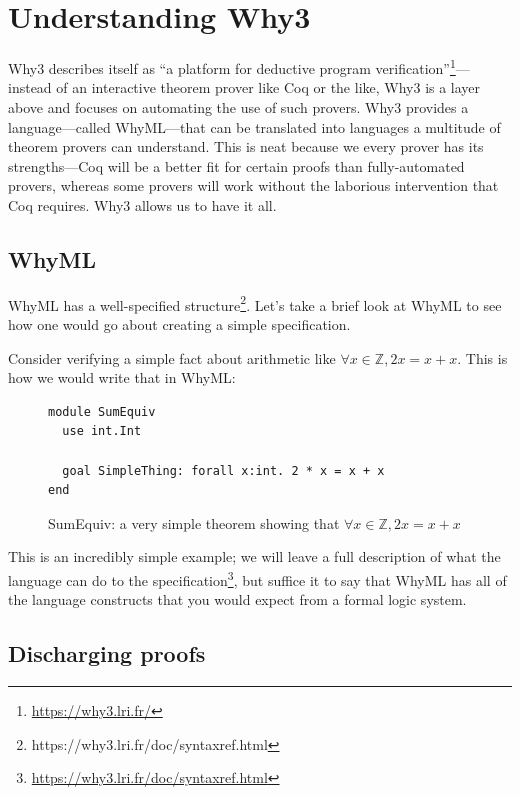 \documentclass[12pt]{article}
\begin{document}

\section{Understanding Why3}
\label{why-why3}

Why3 describes itself as ``a platform for deductive program verification''\footnote{\url{https://why3.lri.fr/}}---instead of an interactive theorem prover like Coq or the like, Why3 is a layer above and focuses on automating the use of such provers.\cite{bobotWhy3ShepherdYour}
Why3 provides a language---called WhyML---that can be translated into languages a multitude of theorem provers can understand.
This is neat because we every prover has its strengths---Coq will be a better fit for certain proofs than fully-automated provers, whereas some provers will work without the laborious intervention that Coq requires.
Why3 allows us to have it all.

\subsection{WhyML}

WhyML has a well-specified structure\footnote{https://why3.lri.fr/doc/syntaxref.html}.
Let's take a brief look at WhyML to see how one would go about creating a simple specification.

Consider verifying a simple fact about arithmetic like $\forall x \in \mathbb{Z}, 2x = x + x$.
This is how we would write that in WhyML:

\begin{figure}[h]
\centering
\begin{verbatim}
module SumEquiv
  use int.Int
  
  goal SimpleThing: forall x:int. 2 * x = x + x
end
\end{verbatim}
\caption{SumEquiv: a very simple theorem showing that $\forall x \in \mathbb{Z}, 2x = x + x$}
\label{fig:sumequiv}
\end{figure}

This is an incredibly simple example; we will leave a full description of what the language can do to the specification\footnote{\url{https://why3.lri.fr/doc/syntaxref.html}}, but suffice it to say that WhyML has all of the language constructs that you would expect from a formal logic system.


\subsection{Discharging proofs}
\end{document}
